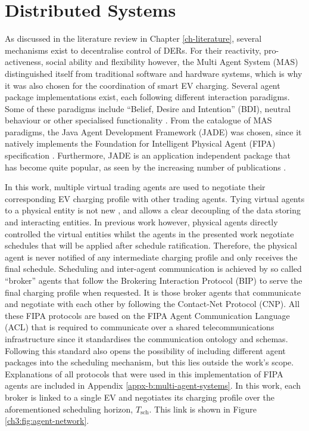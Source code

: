 \section{Distributed Systems}
\label{ch3:sec:distributed-systems}

As discussed in the literature review in Chapter \ref{ch-literature}, several mechanisms exist to decentralise control of DERs.
For their reactivity, pro-activeness, social ability and flexibility however, the Multi Agent System (MAS) distinguished itself from traditional software and hardware systems, which is why it was also chosen for the coordination of smart EV charging.
Several agent package implementations exist, each following different interaction paradigms.
Some of these paradigms include ``Belief, Desire and Intention'' (BDI), neutral behaviour or other specialised functionality \cite{Luck2004}.
From the catalogue of MAS paradigms, the Java Agent Development Framework (JADE) was chosen, since it natively implements the Foundation for Intelligent Physical Agent (FIPA) specification \cite{JADE-website, FIPA-agent-specs}.
Furthermore, JADE is an application independent package that has become quite popular, as seen by the increasing number of publications \cite{Karfopoulos2013, Eddy2011, Kuo2013, Mocci2014, Li2017}.

In this work, multiple virtual trading agents are used to negotiate their corresponding EV charging profile with other trading agents.
Tying virtual agents to a physical entity is not new \cite{Dimeas2005, Nguyen2011, Nagata2011, Nagata2012}, and allows a clear decoupling of the data storing and interacting entities.
In previous work however, physical agents directly controlled the virtual entities whilst the agents in the presented work negotiate schedules that will be applied after schedule ratification.
Therefore, the physical agent is never notified of any intermediate charging profile and only receives the final schedule.
Scheduling and inter-agent communication is achieved by so called ``broker'' agents that follow the Brokering Interaction Protocol (BIP) to serve the final charging profile when requested.
It is those broker agents that communicate and negotiate with each other by following the Contact-Net Protocol (CNP).
All these FIPA protocols are based on the FIPA Agent Communication Language (ACL) that is required to communicate over a shared telecommunications infrastructure since it standardises the communication ontology and schemas.
Following this standard also opens the possibility of including different agent packages into the scheduling mechanism, but this lies outside the work's scope.
Explanations of all protocols that were used in this implementation of FIPA agents are included in Appendix \ref{appx-b:multi-agent-systems}.
In this work, each broker is linked to a single EV and negotiates its charging profile over the aforementioned scheduling horizon, $T_\text{sch}$.
This link is shown in Figure \ref{ch3:fig:agent-network}.

